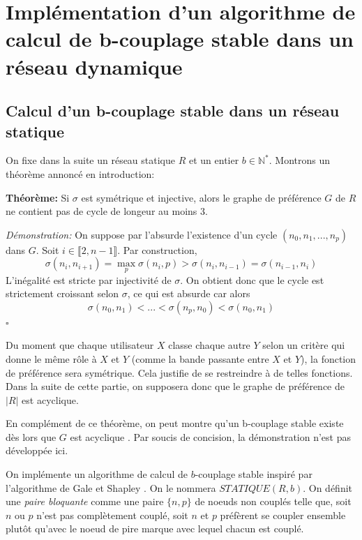 \documentclass[12pt,a4paper]{article}
\begin{document}
\section{Implémentation d'un algorithme de calcul de b-couplage stable dans un réseau dynamique}
\subsection{Calcul d'un b-couplage stable dans un réseau statique}


On fixe dans la suite un réseau statique $R$ et un entier $b\in \mathbb{N}^*$. 
Montrons un théorème \cite{gai} annoncé en introduction:

\vspace{0.2cm}
\textbf{Théorème: }  Si $\sigma$ est symétrique et injective, alors le graphe de préférence $G$ de $R$ ne contient pas de cycle de longeur au moins 3.

\vspace{0.2cm}
\textit{Démonstration: } On suppose par l'absurde l'existence d'un cycle $(n_0, n_1, ..., n_p)$ dans $G$. Soit $i\in \llbracket2, n-1\rrbracket$. Par construction, 
\begin{equation}
    \sigma(n_i, n_{i+1}) = \max\limits_{p} \sigma(n_i, p) > \sigma(n_i, n_{i-1}) = \sigma(n_{i-1}, n_i)
\end{equation}
L'inégalité est stricte par injectivité de $\sigma$. On obtient donc que le cycle est strictement croissant selon $\sigma$, ce qui est absurde car alors 
\begin{equation}
    \sigma(n_0, n_1) < ... < \sigma(n_{p}, n_0) < \sigma(n_0, n_1)
\end{equation}
$\square$
\vspace{0.2cm}

Du moment que chaque utilisateur $X$ classe chaque autre $Y$ selon un critère qui donne 
le même rôle à $X$ et $Y$ (comme la bande passante entre $X$ et $Y$), la fonction de préférence sera symétrique. 
Cela justifie de se restreindre à de telles fonctions. 
Dans la suite de cette partie, on supposera donc que le graphe de préférence de $|R|$ est acyclique.

En complément de ce théorème, on peut montre qu'un b-couplage stable existe dès lors que $G$ est acyclique \cite{lebedev}. 
Par soucis de concision, la démonstration n'est pas développée ici.

On implémente un algorithme de calcul de $b$-couplage stable inspiré par l'algorithme de Gale et Shapley \cite{mathieu}. On le nommera $STATIQUE(R, b)$. 
On définit une \textit{paire bloquante} comme une paire $\{n, p\}$ de noeuds non couplés telle que, soit $n$ ou $p$ n'est pas complètement couplé, soit $n$ et $p$ préfèrent se coupler ensemble plutôt qu'avec le noeud de pire marque avec lequel chacun est couplé.
\end{document}
